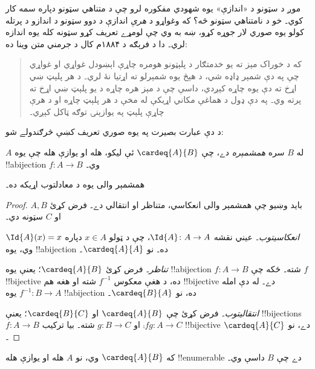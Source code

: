 \documentclass[../../../include/open-logic-section]{subfiles}
\begin{document}


موږ د سټونو د «اندازې» يوه شهودي مفکوره لرو چې د متناهي سټونو
دپاره سمه کار کوي۔ خو د نامتناهي سټونو څه؟ که وغواړو د \emph{هرې}
اندازې د دوو سټونو د اندازو د پرتله کولو يوه صوري لار جوړه کړو،
ښه به وي چې لومړے تعريف کړو سټونه کله يوه اندازه لري۔ دا
د فرېګه د ۱۸۸۴م کال د جرمني متن وينا ده:
\begin{quote}
  که د خوراک مېز ته يو خدمتګار د پلېټونو هومره چاړې اېښودل غواړي او
  غواړي چې په دې شمېر ډاډه شي، د هېڅ يوه شمېرلو ته اړتيا نۀ لري۔
  د هر پلېټ ښي اړخ ته دې يوه چاړه کېږدي، داسې چې د مېز هره چاړه
  د يو پلېټ ښي اړخ ته پرته وي۔ په دې ډول د هماغې مکاني اړيکې له
  مخې د هر پلېټ چاړه او د هرې چاړې پلېټ په يوازېنۍ توګه ټاکل کېږي۔
  \citep[\S70]{Frege1884}
\end{quote}
د دې عبارت بصيرت په يوه صوري تعريف کښې څرګندولے شو:

\begin{defn}
  $A$ له $B$ سره \emph{همشمېره} دے، چې $\cardeq{A}{B}$ ئې ليکو،
  هله او يوازې هله چې يوه !!a{bijection} $f \colon A \to B$ وي۔
\end{defn}

\begin{prop}
همشمېر والی يوه د معادلتوب اړيکه ده۔
\end{prop}

\begin{proof} 
بايد وښيو چې همشمېر والی انعکاسي، متناظر او انتقالي دے۔ فرض
کړئ $A, B$ او $C$ سټونه دي۔

\emph{انعکاسيتوب۔} عيني نقشه $\Id{A} \colon A \to A$، چې د ټولو
$x \in A$ دپاره $\Id{A} (x) = x$ وي، يوه !!a{bijection} ده۔ نو
$\cardeq{A}{A}$۔

\emph{تناظر۔} فرض کړئ $\cardeq{A}{B}$؛ يعنې يوه !!a{bijection}
$f\colon A \to B$ شته۔ ځکه چې $f$ !!{bijective} ده، د هغې معکوس
$f^{-1}$ شته او هغه هم !!{bijective} دے۔ له دې امله
$f^{-1}\colon B \to A$ يوه !!a{bijection} ده، نو $\cardeq{B}{A}$۔

\emph{انتقاليتوب۔} فرض کړئ چې $\cardeq{A}{B}$ او
$\cardeq{B}{C}$؛ يعنې !!{bijection}s $f\colon A \to B$ او
$g\colon B \to C$ شته۔ بيا ترکيب $\comp{f}{g}\colon A \to C$
!!{bijective} دے، نو $\cardeq{A}{C}$۔
\end{proof}

\begin{prop}
که $\cardeq{A}{B}$ وي، نو $A$ هله او يوازې هله !!{enumerable}
دے چې $B$ داسې وي۔
\end{prop}
\end{document}

